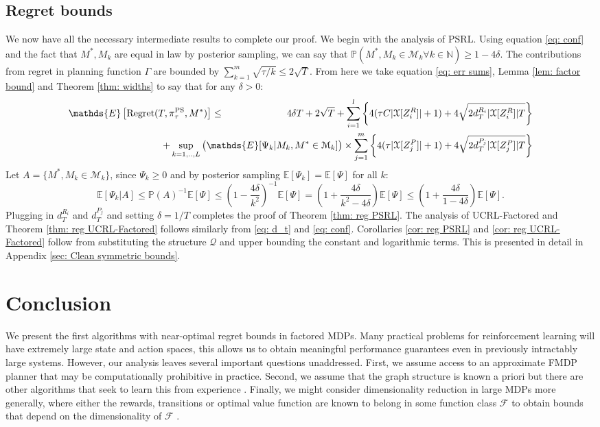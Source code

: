 \documentclass{article}
\newcommand{\Exp}{\mathds{E}}
\newcommand{\Prob}{\mathds{P}}
\newcommand{\Nat}{\mathbb{N}}
\newcommand{\Xc}{\mathcal{X}}
\newcommand{\Qc}{\mathcal{Q}}
\newcommand{\Fc}{\mathcal{F}}
\newcommand{\Mc}{\mathcal{M}}
\begin{document}
\subsection{Regret bounds}
\label{sec: bounds}
We now have all the necessary intermediate results to complete our proof.
We begin with the analysis of PSRL.
Using equation \eqref{eq: conf} and the fact that $M^*,M_k$ are equal in law by posterior sampling, we can say that $\Prob( M^*, M_k \in \Mc_k \forall k \in \Nat) \ge 1-4\delta$.
The contributions from regret in planning function $\Gamma$ are bounded by $ \sum_{k=1}^m \sqrt{\tau/k} \le 2\sqrt{T}$.
From here we take equation \eqref{eq: err sums}, Lemma \ref{lem: factor bound} and Theorem \ref{thm: widths} to say that for any $\delta > 0 $:
\begin{eqnarray*}
	\Exp \left[\mathrm{Regret}(T, \pi^{\rm PS}_{\tau}, M^*) \right] &\le& 4\delta T +2 \sqrt{T} +
		\sum_{i=1}^l \left\{ 4(\tau C |\Xc[Z^R_i]| + 1) + 4\sqrt{2d_T^{R_i} | \Xc[Z^R_i]| T} \right\} \\
	&& \hspace{-25mm} + \sup_{k=1,..,L} \big( \Exp[\Psi_k | M_k, M^* \in \Mc_k] \big) \times \sum_{j=1}^m \left\{ 4(\tau |\Xc[Z^P_j]| + 1) + 4\sqrt{2d_T^{P_j} | \Xc[Z^P_j]| T} \right\}
\end{eqnarray*}
Let $A = \{ M^*, M_k \in \Mc_k \}$, since $\Psi_k \ge 0$ and by posterior sampling $\Exp [ \Psi_k ] = \Exp [\Psi]$ for all $k$:
$$\Exp[ \Psi_k \vert A  ] \le \Prob(A)^{-1} \Exp[\Psi] \le \left( 1 - \frac{4 \delta}{k^2} \right)^{-1} \Exp[ \Psi ] = \left(1 + \frac{4\delta}{k^2 - 4\delta} \right) \Exp[ \Psi ] \le \left(1 + \frac{4\delta}{1 - 4\delta} \right) \Exp[ \Psi ].$$
Plugging in $d_T^{R_i}$ and $d_T^{P_j}$ and setting $\delta=1/T$ completes the proof of Theorem \ref{thm: reg PSRL}.
The analysis of UCRL-Factored and Theorem \ref{thm: reg UCRL-Factored} follows similarly from \eqref{eq: d_t} and \eqref{eq: conf}.
Corollaries \ref{cor: reg PSRL} and \ref{cor: reg UCRL-Factored} follow from substituting the structure $\Qc$ and upper bounding the constant and logarithmic terms.
This is presented in detail in Appendix \ref{sec: Clean symmetric bounds}.

\section{Conclusion}
We present the first algorithms with near-optimal regret bounds in factored MDPs.
Many practical problems for reinforcement learning will have extremely large state and action spaces, this allows us to obtain meaningful performance guarantees even in previously intractably large systems.
However, our analysis leaves several important questions unaddressed.
First, we assume access to an approximate FMDP planner that may be computationally prohibitive in practice.
Second, we assume that the graph structure is known a priori but there are other algorithms that seek to learn this from experience \cite{strehl2007efficient,diuk2009adaptive}.
Finally, we might consider dimensionality reduction in large MDPs more generally, where either the rewards, transitions or optimal value function are known to belong in some function class $\Fc$ to obtain bounds that depend on the dimensionality of $\Fc$ \cite{osband2014model}.
\end{document}

